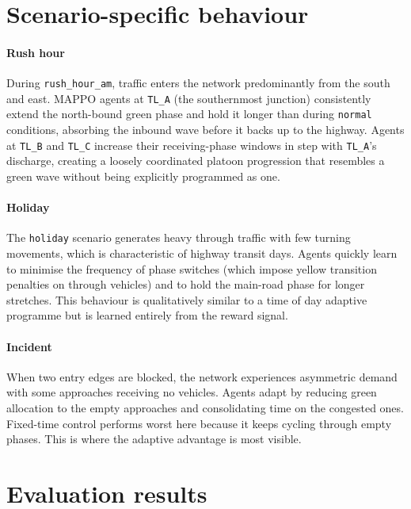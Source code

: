 ﻿\documentclass[11pt, a4paper]{report}
\begin{document}
\section{Scenario-specific behaviour}

\paragraph{Rush hour }

During \texttt{rush\_hour\_am}, traffic enters the network predominantly from the south and east. MAPPO agents at \texttt{TL\_A} (the southernmost junction) consistently extend the north-bound green phase and hold it longer than during \texttt{normal} conditions, absorbing the inbound wave before it backs up to the highway. Agents at \texttt{TL\_B} and \texttt{TL\_C} increase their receiving-phase windows in step with \texttt{TL\_A}'s discharge, creating a loosely coordinated platoon progression that resembles a green wave without being explicitly programmed as one.

\paragraph{Holiday }

The \texttt{holiday} scenario generates heavy through traffic with few turning movements, which is characteristic of highway transit days. Agents quickly learn to minimise the frequency of phase switches (which impose yellow transition penalties on through vehicles) and to hold the main-road phase for longer stretches. This behaviour is qualitatively similar to a time of day adaptive programme but is learned entirely from the reward signal.

\paragraph{Incident }

When two entry edges are blocked, the network experiences asymmetric demand with some approaches receiving no vehicles. Agents adapt by reducing green allocation to the empty approaches and consolidating time on the congested ones. Fixed-time control performs worst here because it keeps cycling through empty phases. This is where the adaptive advantage is most visible.

\section{Evaluation results}
\end{document}
